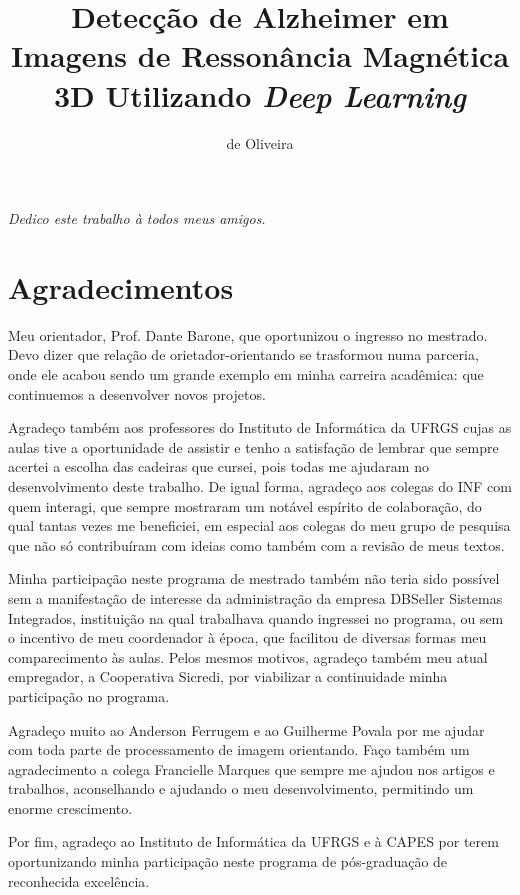 \documentclass[openright]{UFRGS} %
\author{de Oliveira}{Augusto Berwaldt}
\title{Detecção de Alzheimer em Imagens de Ressonância Magnética 3D Utilizando \it{ \textbf{Deep Learning}}}
\begin{document}
\maketitle

\clearpage
\begin{flushright}
\mbox{}\vfill
{\sffamily\itshape
Dedico este trabalho à todos meus amigos.}
\end{flushright}

\chapter*{Agradecimentos}


Meu orientador, Prof. Dante Barone, que oportunizou o ingresso no mestrado. Devo dizer que relação de orietador-orientando se trasformou numa parceria, onde ele acabou sendo um grande exemplo em minha carreira acadêmica: que continuemos a desenvolver novos projetos.

Agradeço também aos professores do Instituto de Informática da UFRGS cujas
as aulas tive a oportunidade de assistir e tenho a satisfação de lembrar que sempre acertei a escolha das cadeiras que cursei, pois todas me ajudaram no desenvolvimento deste
trabalho. De igual forma, agradeço aos colegas do INF com quem interagi, que sempre
mostraram um notável espírito de colaboração, do qual tantas vezes me beneficiei, em
especial aos colegas do meu grupo de pesquisa que não só contribuíram com ideias como
também com a revisão de meus textos.

Minha participação neste programa de mestrado também não teria sido possível
sem a manifestação de interesse da administração da empresa DBSeller Sistemas Integrados, instituição
na qual trabalhava quando ingressei no programa, ou sem o incentivo de meu coordenador
à época, que facilitou de diversas formas meu comparecimento às aulas. Pelos mesmos
motivos, agradeço também meu atual empregador, a Cooperativa Sicredi, por viabilizar a continuidade minha participação no programa.

Agradeço muito ao Anderson Ferrugem e ao Guilherme Povala  por me ajudar com toda parte de processamento de imagem orientando. Faço também um agradecimento a colega Francielle Marques que sempre me ajudou nos artigos e trabalhos, aconselhando e ajudando o meu desenvolvimento, permitindo um enorme crescimento. 

Por fim, agradeço ao Instituto de Informática da UFRGS e à CAPES por terem
oportunizando minha participação neste programa de pós-graduação de reconhecida excelência.
\end{document}
